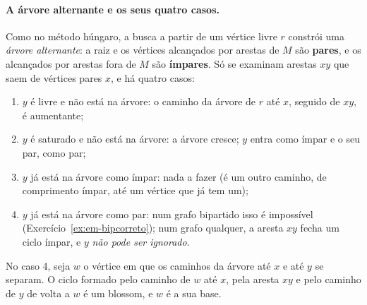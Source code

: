 \paragraph{A árvore alternante e os seus quatro casos.} Como no método húngaro, a busca a partir de um vértice livre $r$ constrói uma \emph{árvore alternante}: a raiz e os vértices alcançados por arestas de $M$ são \textbf{pares}, e os alcançados por arestas fora de $M$ são \textbf{ímpares}. Só se examinam arestas $xy$ que saem de vértices pares $x$, e há quatro casos:
\begin{enumerate}
  \item $y$ é livre e não está na árvore: o caminho da árvore de $r$ até $x$, seguido de $xy$, é aumentante;
  \item $y$ é saturado e não está na árvore: a árvore cresce; $y$ entra como ímpar e o seu par, como par;
  \item $y$ já está na árvore como ímpar: nada a fazer (é um outro caminho, de comprimento ímpar, até um vértice que já tem um);
  \item $y$ já está na árvore como par: num grafo bipartido isso é impossível (Exercício~\ref{ex:em-bipcorreto}); num grafo qualquer, a aresta $xy$ fecha um ciclo ímpar, e $y$ \emph{não pode ser ignorado}.
\end{enumerate}
No caso 4, seja $w$ o vértice em que os caminhos da árvore até $x$ e até $y$ se separam. O ciclo formado pelo caminho de $w$ até $x$, pela aresta $xy$ e pelo caminho de $y$ de volta a $w$ é um blossom, e $w$ é a sua base.


